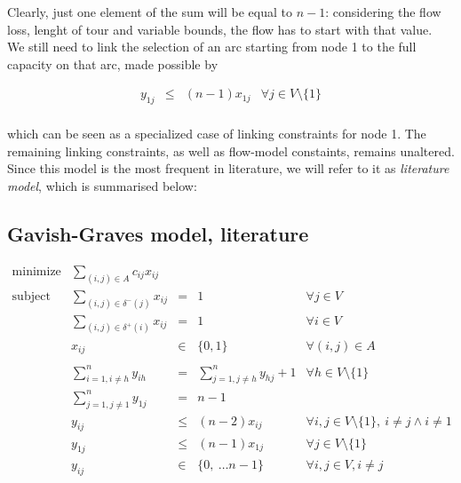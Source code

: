 \newpage
Clearly, just one element of the sum will be equal to $n - 1$: considering the
flow loss, lenght of tour and variable bounds, the flow has to start with that
value.\\ 
We still need to link the selection of an arc starting from node 1 to
the full capacity on that arc, made possible by 

\begin{equation*} 
    \begin{array}{rrlr} 
        y_{1j} & \leq & (n - 1) x_{1j} & \forall j \in V \setminus \{1\} \\
    \end{array} 
\end{equation*}

which can be seen as a specialized case of linking constraints for node 1. The
remaining linking constraints, as well as flow-model constaints, remains
unaltered.
Since this model is the most frequent in literature, we will refer to it as
\emph{literature model}, which is summarised below:

\subsection{Gavish-Graves model, literature}
\begin{equation*}
    \begin{array}{lrllr}
        \textrm{minimize}   & \displaystyle\sum_{(i, j) \in A} c_{ij}  x_{ij} \\
        \textrm{subject to} & \displaystyle\sum\limits_{(i, j) \in \delta^-(j)}  x_{ij} & = & 1 & \forall j \in V\\
                            & \displaystyle\sum\limits_{(i, j) \in \delta^+(i)}  x_{ij} & = & 1 & \forall i \in V\\
                            & x_{ij} & \in & \{0,1\} & \forall (i,j) \in A \\ \\
                            & \displaystyle\sum\limits_{i = 1, i \neq h}^n y_{ih} & = & \displaystyle\sum\limits_{j = 1, j \neq h}^n y_{hj} + 1 & \forall h \in V \setminus \{1\}\\
                            & \displaystyle\sum\limits_{j = 1, j \neq 1}^n y_{1j} & = & n - 1 & \\
                            & y_{ij} & \leq & (n - 2) x_{ij} & \forall i, j \in V \setminus \{1\},\ i \neq j \wedge i \neq 1 \\
                            & y_{1j} & \leq & (n - 1) x_{1j} & \forall j \in V \setminus \{1\} \\
                            & y_{ij} & \in & \{0,\ \dots n-1\} & \forall i,j \in V, i \neq j
    \end{array}
\end{equation*}

